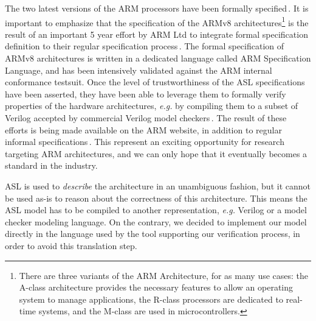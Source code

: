 The two latest versions of the ARM processors have been formally
specified\,\cite{fox2010armv7,reid2016armv8}.
%
It is important to emphasize that the specification of the ARMv8
architectures\footnote{There are three variants of the ARM Architecture, for as
  many use cases: the A-class architecture provides the necessary features to
  allow an operating system to manage applications, the R-class processors are
  dedicated to real-time systems, and the M-class are used in microcontrollers.}
is the result of an important 5 year effort by ARM Ltd to integrate formal
specification definition to their regular specification
process\,\cite{reid2016armv8}.
%
The formal specification of ARMv8 architectures is written in a dedicated
language called ARM Specification Language, and has been intensively validated
against the ARM internal conformance testsuit.
%
Once the level of trustworthiness of the ASL specifications have been asserted,
they have been able to leverage them to formally verify properties of the
hardware architectures, \emph{e.g.} by compiling them to a subset of Verilog
accepted by commercial Verilog model checkers\,\cite{reid2016end}.
%
The result of these efforts is being made available on the ARM website, in
addition to regular informal specifications\,\cite{arm2018aspec}.
%
This represent an exciting opportunity for research targeting ARM architectures,
and we can only hope that it eventually becomes a standard in the industry.

ASL is used to \emph{describe} the architecture in an unambiguous fashion, but
it cannot be used as-is to reason about the correctness of this architecture.
%
This means the ASL model has to be compiled to another representation,
\emph{e.g.} Verilog or a model checker modeling language.
%
On the contrary, we decided to implement our model directly in the language used
by the tool supporting our verification process, in order to avoid this
translation step.

